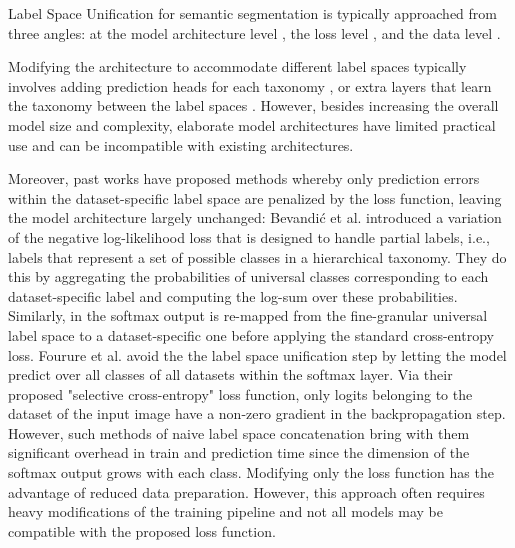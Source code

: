 Label Space Unification for semantic segmentation is typically approached from three angles: at the model architecture level \cite{bib:automated-label-unification, bib:multi-head-semseg, bib:cross-dataset-learning, bib:universal-ssss, bib:heterogeneous-street-datasets, bib:multi-task-domain-learning}, the loss level \cite{bib:universal-image-concepts, bib:partial-label-losses, bib:multi-domain-semseg, bib:heterogeneous-street-datasets, bib:multi-task-domain-learning}, and the data level \cite{bib:mseg, bib:unifying-off-road}.

Modifying the architecture to accommodate different label spaces typically involves adding prediction heads for each taxonomy \cite{bib:heterogeneous-street-datasets, bib:multi-head-semseg, bib:universal-ssss, bib:multi-task-domain-learning}, or extra layers that learn the taxonomy between the label spaces \cite{bib:automated-label-unification}.
However, besides increasing the overall model size and complexity, elaborate model architectures have limited practical use and can be incompatible with existing architectures.

Moreover, past works have proposed methods whereby only prediction errors within the dataset-specific label space are penalized by the loss function, leaving the model architecture largely unchanged:
Bevandi\'{c} et al. \cite{bib:universal-image-concepts, bib:multi-domain-semseg} introduced a variation of the negative log-likelihood loss that is designed to handle partial labels, i.e., labels that represent a set of possible classes in a hierarchical taxonomy.
They do this by aggregating the probabilities of universal classes corresponding to each dataset-specific label and computing the log-sum over these probabilities.
Similarly, in \cite{bib:heterogeneous-datasets} the softmax output is re-mapped from the fine-granular universal label space to a dataset-specific one before applying the standard cross-entropy loss.
Fourure et al. \cite{bib:multi-task-domain-learning} avoid the the label space unification step by letting the model predict over all classes of all datasets within the softmax layer.
Via their proposed "selective cross-entropy" loss function, only logits belonging to the dataset of the input image have a non-zero gradient in the backpropagation step.
However, such methods of naive label space concatenation bring with them significant overhead in train and prediction time since the dimension of the softmax output grows with each class.
Modifying only the loss function has the advantage of reduced data preparation.
However, this approach often requires heavy modifications of the training pipeline and not all models may be compatible with the proposed loss function.

